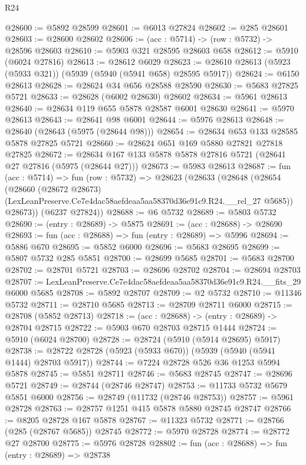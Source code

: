 \begin{lexlean}{R24}
\begin{coremodule}
@28600 := @5892 @28599
@28601 := @6013 @27824
@28602 := @285 @28601
@28603 := @28600 @28602
@28606 := (acc : @5714) -> (row : @5732) -> @28596 @28603
@28610 := @5903 @321 @28595 @28603 @658
@28612 := @5910 (@6024 @27816)
@28613 := @28612 @6029
@28623 := @28610 @28613 (@5923 (@5933 @321)) (@5939 (@5940 (@5941 @658) @28595 @5917))
@28624 := @6150 @28613
@28628 := @28624 @34 @656 @28588 @28590
@28630 := @5683 @27825 @5721
@28633 := @28628 (@6002 @28630) @28602
@28634 := @5961 @28613
@28640 := @28634 @119 @655 @5878 @28587 @6001 @28630
@28641 := @5970 @28613
@28643 := @28641 @98 @6001
@28644 := @5976 @28613
@28648 := @28640 (@28643 (@5975 (@28644 @98)))
@28654 := @28634 @653 @133 @28585 @5878 @27825 @5721
@28660 := @28624 @651 @169 @5880 @27821 @27818 @27825
@28672 := @28634 @167 @133 @5878 @5878 @27816 @5721 (@28641 @27 @27816 (@5975 (@28644 @27)))
@28673 := @5983 @28613
@28687 := fun (acc : @5714) =>
  fun (row : @5732) =>
  @28623
    (@28633
      (@28648
        (@28654
          (@28660
            (@28672 @28673)
            (LexLeanPreserve.Ce7e4dac58aefdeaa5aa58370d36e91c9.R24.__rel_27 @5685))
          @28673))
      (@6237 @27824))
@28688 := @6 @5732
@28689 := @5803 @5732
@28690 := (entry : @28689) -> @5875
@28691 := (acc : @28688) -> @28690
@28693 := fun (acc : @28688) => fun (entry : @28689) => @5996
@28694 := @5886 @670
@28695 := @5852 @6000
@28696 := @5683 @28695
@28699 := @5807 @5732 @285 @5851
@28700 := @28699 @5685
@28701 := @5683 @28700
@28702 := @28701 @5721
@28703 := @28696 @28702
@28704 := @28694 @28703
@28707 := LexLeanPreserve.Ce7e4dac58aefdeaa5aa58370d36e91c9.R24.__fits_29 @6000 @5685
@28708 := @5892 @28707
@28709 := @2 @5732
@28710 := @11346 @5732
@28711 := @28710 @5685
@28713 := @28709 @28711 @6000
@28715 := @28708 (@5852 @28713)
@28718 := (acc : @28688) -> (entry : @28689) -> @28704 @28715
@28722 := @5903 @670 @28703 @28715 @1444
@28724 := @5910 (@6024 @28700)
@28728 := @28724 (@5910 (@5914 @28695) @5917)
@28738 := @28722 @28728 (@5923 (@5933 @670)) (@5939 (@5940 (@5941 @1444) @28703 @5917))
@28744 := @7224 @28728 @526 @36 @1253 @5994 @5878
@28745 := @5851 @28711
@28746 := @5683 @28745
@28747 := @28696 @5721
@28749 := @28744 (@28746 @28747)
@28753 := @11733 @5732 @5679 @5851 @6000
@28756 := @28749 (@11732 (@28746 @28753))
@28757 := @5961 @28728
@28763 := @28757 @1251 @415 @5878 @5880 @28745 @28747
@28766 := @8205 @28728 @167 @5878
@28767 := @11323 @5732
@28771 := @28766 (@285 (@28767 @5685)) @28745
@28772 := @5970 @28728
@28774 := @28772 @27 @28700
@28775 := @5976 @28728
@28802 := fun (acc : @28688) =>
  fun (entry : @28689) =>
  @28738

\end{coremodule}
\end{lexlean}
